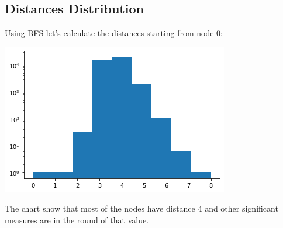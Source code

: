 \documentclass[]{article}
\begin{document}
    \subsection*{Distances Distribution}
    Using BFS let's calculate the distances starting from node 0:
    \begin{center}
        \includegraphics[scale=0.5]{charts/distances.png}
    \end{center}
    The chart show that most of the nodes have distance 4 and other significant measures are in the round of that value.

\end{document}
